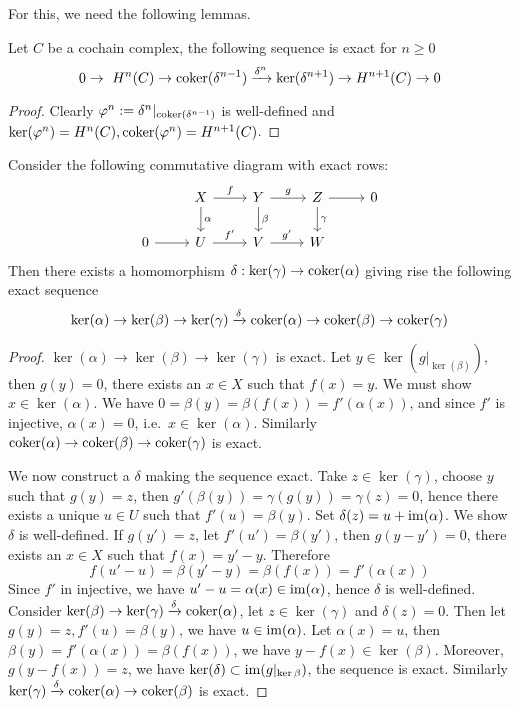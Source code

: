 For this, we need the following lemmas.

\begin{lem}\label{coho short exact}
    Let $C$ be a cochain complex, the following sequence is exact for $n\geq 0$
    \[0\to\ H^n(C)\to\coker(\delta^{n-1})\xrightarrow{\delta^n}\ker(\delta^{n+1})\to H^{n+1}(C)\to 0\]
\end{lem}
\begin{proof}
    Clearly $\varphi^n:=\delta^n|_{\operatorname{coker}(\delta^{n-1})}$ is well-defined and $\ker(\varphi^n)=H^n(C),\operatorname{coker}(\varphi^n)=H^{n+1}(C)$.
\end{proof}

\begin{lem}
    Consider the following commutative diagram with exact rows:
    \[\begin{tikzcd}
        {} & X \ar[r, "f"] \ar[d,"\alpha"] & Y \ar[r, "g"] \ar[d,"\beta"] & Z \ar[r] \ar[d,"\gamma"] & 0 \\
        0 \ar[r] & U \ar[r, "f'"] & V \ar[r, "g'"] & W & {}
    \end{tikzcd}\]
    Then there exists a homomorphism $\delta:\ker(\gamma)\to\operatorname{coker}(\alpha)$ giving rise the following exact sequence
    \[\ker(\alpha)\to\ker(\beta)\to\ker(\gamma)\xrightarrow{\delta}\operatorname{coker}(\alpha)\to\operatorname{coker}(\beta)\to\operatorname{coker}(\gamma)\]
\end{lem}
\begin{proof}
    $\ker(\alpha)\to\ker(\beta)\to\ker(\gamma)$ is exact.
    Let $y\in\ker(g|_{\ker(\beta)})$, then $g(y)=0$, there exists an $x\in X$ such that $f(x)=y$.
    We must show $x\in\ker(\alpha)$.
    We have $0=\beta(y)=\beta(f(x))=f'(\alpha(x))$, and since $f'$ is injective, $\alpha(x)=0$, i.e.\ $x\in\ker(\alpha)$.
    Similarly $\operatorname{coker}(\alpha)\to\operatorname{coker}(\beta)\to\operatorname{coker}(\gamma)$ is exact.

    We now construct a $\delta$ making the sequence exact.
    Take $z\in\ker(\gamma)$, choose $y$ such that $g(y)=z$, then $g'(\beta(y))=\gamma(g(y))=\gamma(z)=0$, hence there exists a unique $u\in U$ such that $f'(u)=\beta(y)$.
    Set $\delta(z)=u+\operatorname{im}(\alpha)$.
    We show $\delta$ is well-defined.
    If $g(y')=z$, let $f'(u')=\beta(y')$, then $g(y-y')=0$, there exists an $x\in X$ such that $f(x)=y'-y$.
    Therefore
    \[f(u'-u)=\beta(y'-y)=\beta(f(x))=f'(\alpha(x))\]
    Since $f'$ in injective, we have $u'-u=\alpha(x)\in\operatorname{im}(\alpha)$, hence $\delta$ is well-defined.
    Consider $\ker(\beta)\to\ker(\gamma)\xrightarrow{\delta}\operatorname{coker}(\alpha)$, let $z\in\ker(\gamma)$ and $\delta(z)=0$.
    Then let $g(y)=z,f'(u)=\beta(y)$, we have $u\in\operatorname{im}(\alpha)$.
    Let $\alpha(x)=u$, then $\beta(y)=f'(\alpha(x))=\beta(f(x))$, we have $y-f(x)\in\ker(\beta)$.
    Moreover, $g(y-f(x))=z$, we have $\ker(\delta)\subset\operatorname{im}(g|_{\ker\beta})$, the sequence is exact.
    Similarly $\ker(\gamma)\xrightarrow{\delta}\operatorname{coker}(\alpha)\to\operatorname{coker}(\beta)$ is exact.
\end{proof}


